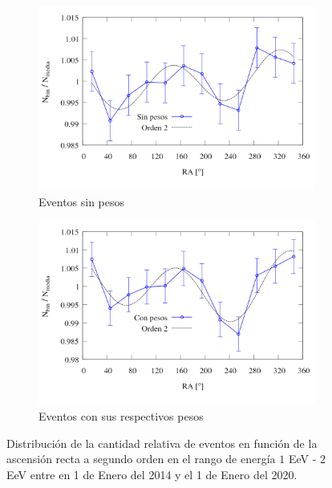         \begin{figure}[H]
          \centering
            \begin{subfigure}[b]{0.5\textwidth}
		\centering
		\includegraphics[width=\linewidth]{eventos_clasificados_por_RA_v6_orden_2_sin_pesos.png}
		\caption{Eventos sin pesos}		\label{fig:bin_events_second_order_sin}
            \end{subfigure}%
            \begin{subfigure}[b]{0.5\textwidth}
		\centering
		\includegraphics[width=\linewidth]{eventos_clasificados_por_RA_v6_orden_2.png}
		\caption{ Eventos con sus respectivos pesos}		\label{fig:bin_events_second_order_con}
            \end{subfigure}
           \caption{Distribución de la cantidad relativa de eventos en función de la ascensión recta a segundo orden en el rango de energía $1$ EeV - $2$ EeV entre en 1 de Enero del 2014 y el 1 de Enero del 2020.}
         \end{figure}

